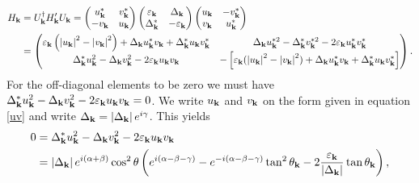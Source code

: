 \begin{equation}
\begin{split}
    H_{\mathbf{k}} &= 
    U_{\mathbf{k}}^{\dagger}H_{\mathbf{k}}'U_{\mathbf{k}} = 
    \begin{pmatrix}
        u_{\mathbf{k}}^* & v_{\mathbf{k}}^* \\
        -v_{\mathbf{k}} & u_{\mathbf{k}}
    \end{pmatrix}
    \begin{pmatrix}
        \varepsilon_{\bf{k}} & \Delta_{\bf{k}}\\
        \Delta_{\bf{k}}^* & -\varepsilon_{\bf{k}} 
    \end{pmatrix}
    \begin{pmatrix}
        u_{\mathbf{k}} & -v_{\mathbf{k}}^* \\
        v_{\mathbf{k}} & u^*_{\mathbf{k}}
    \end{pmatrix}
    \\
    &=
    \begin{pmatrix}
        \varepsilon_{\mathbf{k}}\left(\left|u_{\mathbf{k}}\right|^2 - \left|v_{\mathbf{k}}\right|^2 \right) + \Delta_{\mathbf{k}}u^*_{\mathbf{k}}v_{\mathbf{k}} + \Delta_{\mathbf{k}}^*u_{\mathbf{k}}v^*_{\mathbf{k}}
        &
        \Delta_{\mathbf{k}}u_{\mathbf{k}}^{*2} - \Delta_{\mathbf{k}}^*v^{*2}_{\mathbf{k}}-2\varepsilon_{\mathbf{k}}u^*_{\mathbf{k}}v_{\mathbf{k}}^*
        \\
        \Delta_{\mathbf{k}}^*u^2_{\mathbf{k}} - \Delta_{\mathbf{k}}v_{\mathbf{k}}^2 -2\varepsilon_{\mathbf{k}}u_{\mathbf{k}}v_{\mathbf{k}}
        &
        -\left[\varepsilon_{\mathbf{k}}(\left|u_{\mathbf{k}}\right|^2 - \left|v_{\mathbf{k}}\right|^2) + \Delta_{\mathbf{k}}u^*_{\mathbf{k}}v_{\mathbf{k}} + \Delta_{\mathbf{k}}^*u_{\mathbf{k}}v^*_{\mathbf{k}}\right]
    \end{pmatrix}.
\end{split}
\label{Hk}
\end{equation}
For the off-diagonal elements to be zero we must have $\Delta^*_{\mathbf{k}}u_{\mathbf{k}}^2 - \Delta_{\mathbf{k}}v^2_{\mathbf{k}} - 2\varepsilon_{\mathbf{k}}u_{\mathbf{k}}v_{\mathbf{k}}= 0$. We write $u_{\mathbf{k}}$ and $v_{\mathbf{k}}$ on the form given in equation \eqref{uv} and write $\Delta_{\mathbf{k}} = \left|\Delta_{\mathbf{k}}\right|e^{i\gamma}$. This yields
\begin{equation*}
\begin{split}
    0 &= \Delta^*_{\mathbf{k}}u_{\mathbf{k}}^2 - \Delta_{\mathbf{k}}v^2_{\mathbf{k}} - 2\varepsilon_{\mathbf{k}}u_{\mathbf{k}}v_{\mathbf{k}}
    \\
    &= \left|\Delta_{\mathbf{k}}\right|e^{i(\alpha+\beta)}\cos^2\theta
    \left(e^{i(\alpha-\beta-\gamma)} - e^{-i(\alpha-\beta-\gamma)}\tan^2\theta_{\mathbf{k}} - 2\frac{\varepsilon_{\mathbf{k}}}{\left|\Delta_{\mathbf{k}}\right|}\tan\theta_{\mathbf{k}}\right),
\end{split}
\end{equation*}
